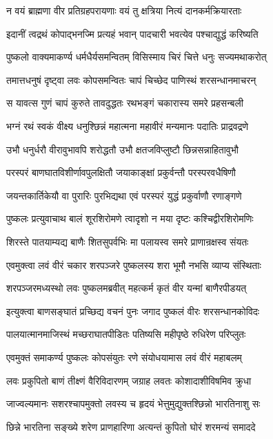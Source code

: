 \twolineshloka
{न वयं ब्राह्मणा वीर प्रतिग्रहपरायणाः}
{वयं तु क्षत्रिया नित्यं दानकर्मक्रियारताः}%

\twolineshloka
{इदानीं त्वद्रथं कोपाद्भनज्मि प्रत्यहं भवान्}
{पादचारी भवत्येव पश्चाद्युद्धं करिष्यति}%

\twolineshloka
{पुष्कलो वाक्यमाकर्ण्य धर्मधैर्यसमन्वितम्}
{विसिस्माय चिरं चित्ते धनुः सज्यमथाकरोत्}%

\twolineshloka
{तमात्तधनुषं दृष्ट्वा लवः कोपसमन्वितः}
{चापं चिच्छेद पाणिस्थं शरसन्धानमाचरन्}%

\twolineshloka
{स यावत्स गुणं चापं कुरुते तावदुद्धतः}
{रथभङ्गं चकारास्य समरे प्रहसन्बली}%

\twolineshloka
{भग्नं रथं स्वकं वीक्ष्य धनुश्छिन्नं महात्मना}
{महावीरं मन्यमानः पदातिः प्राद्रवद्रणे}%

\twolineshloka
{उभौ धनुर्धरौ वीरावुभावपि शरोद्धतौ}
{उभौ क्षतजविप्लुष्टौ छिन्नसन्नाहितावुभौ}%

\twolineshloka
{परस्परं बाणघातविशीर्णावपुलक्षितौ}
{जयाकाङ्क्षां प्रकुर्वन्तौ परस्परवधैषिणौ}%

\twolineshloka
{जयन्तकार्तिकेयौ वा पुरारिः पुरभिद्यथा}
{एवं परस्परं युद्धं प्रकुर्वाणौ रणाङ्गणे}%

\twolineshloka
{पुष्कलः प्रत्युवाचाथ बालं शूरशिरोमणे}
{त्वादृशो न मया दृष्टः कश्चिद्वीरशिरोमणिः}%

\twolineshloka
{शिरस्ते पातयाम्यद्य बाणैः शितसुपर्वभिः}
{मा पलायस्व समरे प्राणान्रक्षस्व संयतः}%

\twolineshloka
{एवमुक्त्वा लवं वीरं चकार शरपञ्जरे}
{पुष्कलस्य शरा भूमौ नभसि व्याप्य संस्थिताः}%

\twolineshloka
{शरपञ्जरमध्यस्थो लवः पुष्कलमब्रवीत्}
{महत्कर्म कृतं वीर यन्मां बाणैरपीडयत्}%

\twolineshloka
{इत्युक्त्वा बाणसङ्घातं प्रच्छिद्य वचनं पुनः}
{जगाद पुष्कलं वीरः शरसन्धानकोविदः}%

\twolineshloka
{पालयात्मानमाजिस्थं मच्छराघातपीडितः}
{पतिष्यसि महीपृष्ठे रुधिरेण परिप्लुतः}%

\twolineshloka
{एवमुक्तं समाकर्ण्य पुष्कलः कोपसंयुतः}
{रणे संयोधयामास लवं वीरं महाबलम्}%

\twolineshloka
{लवः प्रकुपितो बाणं तीक्ष्णं वैरिविदारणम्}
{जग्राह लवतः कोशादाशीविषमिव क्रुधा}%

\twolineshloka
{जाज्वल्यमानः सशरश्चापमुक्तो लवस्य च}
{हृदयं भेत्तुमुद्युक्तश्छिन्नो भारतिनाशु सः}%

\twolineshloka
{छिन्ने भारतिना सङ्ख्ये शरेण प्राणहारिणा}
{अत्यन्तं कुपितो घोरं शरमन्यं समाददे}%

